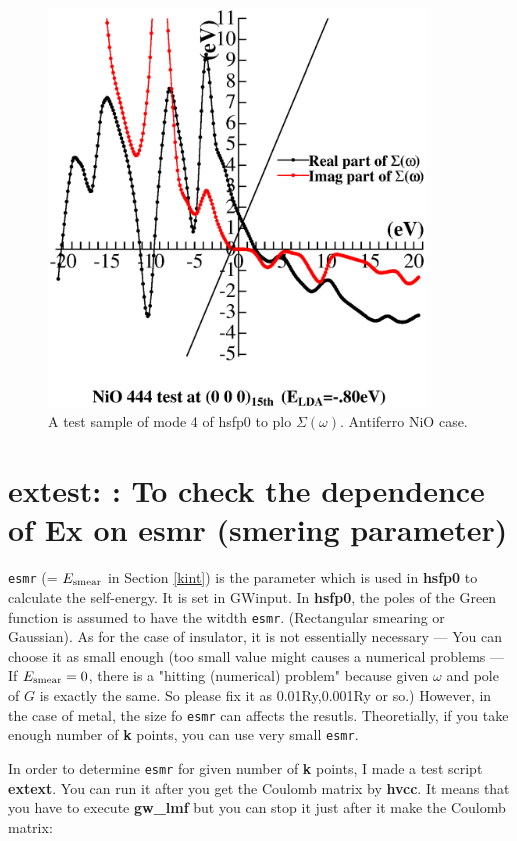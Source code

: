 \documentclass[a4paper,10pt,epsf,fleqn]{article}
\newcommand{\io}[1]{{\sf  #1}}
\newcommand{\raw}[1]{{\tt #1}}
\begin{document}
{{{\begin{figure}
\includegraphics[width=10cm]{nio_sp2.eps}
\caption[]{A test sample of mode 4 of hsfp0 to plo $\Sigma(\omega)$. Antiferro NiO case.}
\label{niospect}
\end{figure}




\newpage
\section{extest: : To check the dependence of Ex on esmr (smering parameter)}
\baselineskip=5mm
\verb#esmr# (= $E_{\rm smear}$ in Section \ref{kint})
is the parameter which is used in {\bf hsfp0} to calculate the self-energy.
It is set in \io{GWinput}.
In {\bf hsfp0}, the poles of the Green function is assumed to have the witdth {\tt esmr}.
(Rectangular smearing or Gaussian).
As for the case of insulator, it is not essentially necessary
--- You can choose it as small enough
(too small value might causes a numerical problems --- If $E_{\rm smear}=0$,
there is a "hitting (numerical) problem" because given $\omega$ and pole of $G$ is exactly the same.
So please fix it as 0.01Ry,0.001Ry or so.)
However, in the case of metal, the size fo \raw{esmr} can affects 
the resutls. Theoretially, if you take enough number of {\bf k} points,
you can use very small {\tt esmr}.

In order to determine {\tt esmr} for given number of {\bf k} points, 
I made a test script {\bf extext}.
You can run it after you get the Coulomb matrix by {\bf hvcc}.
It means that you have to execute {\bf gw\_lmf} 
but you can stop it just after it make the Coulomb matrix:

}}}
\end{document}

